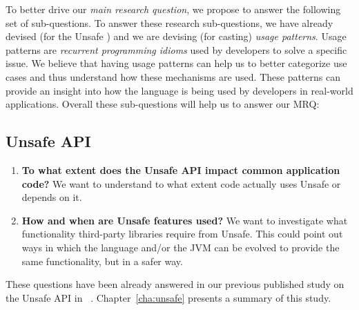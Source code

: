 To better drive our \emph{main research question},
we propose to answer the following set of sub-questions.
To answer these research sub-questions,
we have already devised (for the Unsafe \api{}) and
we are devising (for casting)
\emph{usage patterns}.
Usage patterns are \emph{recurrent programming idioms} used by developers to solve a specific issue.
We believe that having usage patterns can help us to better categorize use cases and
thus understand how these mechanisms are used.
These patterns can provide an insight into how the language is being used by developers in real-world applications.
Overall these sub-questions will help us to answer our MRQ:

\newcommand{\urqA}{To what extent does the Unsafe API impact common application code?}
\newcommand{\urqB}{How and when are Unsafe features used?}

\subsection*{Unsafe API}

\begin{enumerate}[label=$URQ\arabic*:$,ref=$URQ\arabic*$,leftmargin=3.4\parindent]
\item\label{unsafe:rq1} {\bf \urqA}
We want to understand to what extent
code actually uses Unsafe or depends on it.

\item\label{unsafe:rq2} {\bf \urqB}
We want to investigate what functionality third-party libraries require from Unsafe.
This could point out ways in which the \java{} language and/or
the JVM can be evolved to provide the same functionality,
but in a safer way.
\end{enumerate}

These questions have been already answered in our previous published
study on the Unsafe API in \java{}~\citep{mastrangeloUseYourOwn2015}.
Chapter~\ref{cha:unsafe} presents a summary of this study.

\newcommand{\crqA}{How frequently is casting used in common application code?}
\newcommand{\crqB}{How and when casts are used?}
\newcommand{\crqC}{How recurrent are the patterns for which casts are used?}

